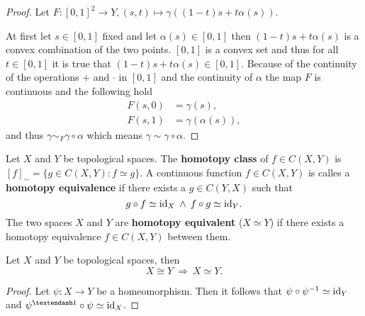 \begin{proof}
  Let $F\colon [0,1]^2 \to Y, (s, t) \mapsto \gamma((1 - t)s + t\alpha(s))$.

  At first let $s \in [0,1]$ fixed and let $\alpha(s) \in [0,1]$ then $(1 - t)s + t\alpha(s)$ is a convex combination of the two points. 
  $[0,1]$ is a convex set and thus for all $t\in[0,1]$ it is true that $(1 - t)s + t\alpha(s) \in [0,1]$. Because of the continuity of the operations $+$ and $\cdot$ in $[0,1]$ 
  and the continuity of $\alpha$ the map $F$ is continuous and the following hold
  \begin{align*}
    F(s, 0) &= \gamma(s), \\
    F(s, 1) &= \gamma(\alpha(s)),
  \end{align*}
  and thus $\gamma \sim_F \gamma \circ \alpha$ which means $\gamma \sim \gamma \circ \alpha$.
\end{proof}

\begin{defin}
  Let $X$ and $Y$ be topological spaces. The \textbf{homotopy class} of $f \in C(X, Y)$ is $[f]_{\sim} = \{g \in C(X, Y)\colon f \simeq g\}$. A continuous function $f \in C(X, Y)$ is calles a \textbf{homotopy equivalence} if there exists a $g \in C(Y, X)$ such that
  \begin{equation*}
    g \circ f \simeq {\rm id}_X \: \land \: f \circ g \simeq {\rm id}_Y.
  \end{equation*}
  The two spaces $X$ and $Y$ are \textbf{homotopy equivalent} ($X \simeq Y$) if there exists a homotopy equivalence $f \in C(X, Y)$ between them.
\end{defin}

\begin{lemma}
  Let $X$ and $Y$ be topological spaces, then
  \begin{equation*}
    X \cong Y \: \Rightarrow \: X \simeq Y.
  \end{equation*}
\end{lemma}

\begin{proof}
  Let $\psi\colon X \to Y$ be a homeomorphism. Then it follows that $\psi \circ \psi^{-1} \simeq {\rm id}_Y$ and $\psi^{–1} \circ \psi \simeq \id_X$.  
\end{proof}
